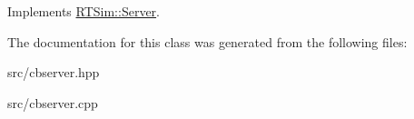 Implements \hyperlink{classRTSim_1_1Server_a1397b6ddbad8ed5857c7242261ec737d}{R\+T\+Sim\+::\+Server}.



The documentation for this class was generated from the following files\+:\begin{DoxyCompactItemize}
\item 
src/cbserver.\+hpp\item 
src/cbserver.\+cpp\end{DoxyCompactItemize}
